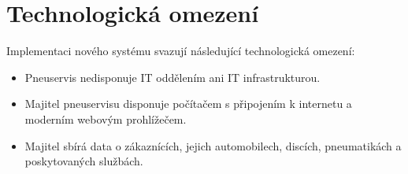 \section{Technologická omezení}
Implementaci nového systému svazují následující technologická omezení:
\begin{itemize}
    \item Pneuservis nedisponuje IT oddělením ani IT infrastrukturou.
    \item Majitel pneuservisu disponuje počítačem s připojením k internetu a moderním webovým prohlížečem.
    \item Majitel sbírá data o zákaznících, jejich automobilech, discích, pneumatikách a poskytovaných službách. 
\end{itemize}

